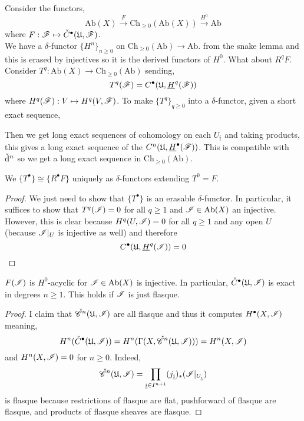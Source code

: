 \documentclass[12pt]{article}
\begin{document}
Consider the functors,
\[ \mathrm{Ab}(X) \xrightarrow{F} \mathrm{Ch}_{\ge 0}(\mathrm{Ab}(X)) \xrightarrow{H^0} \mathrm{Ab} \]
where $F : \mathscr{F} \mapsto \check{C}^\bullet(\mathfrak{U}, \mathscr{F})$. 
\bigskip\\
We have a $\delta$-functor $\{ H^n \}_{n \ge 0}$ on $\mathrm{Ch}_{\ge 0}(\mathrm{Ab}) \to \mathrm{Ab}$. from the snake lemma and this is erased by injectives so it is the derived functors of $H^0$. What about $R^q F$. Consider $T^q : \mathrm{Ab}(X) \to \mathrm{Ch}_{\ge 0}(\mathrm{Ab})$ sending,
\[ T^q(\mathscr{F}) = C^\bullet(\mathfrak{U}, \underline{H}^q(\mathscr{F})) \]
where $H^q(\mathscr{F}) : V \mapsto H^q(V, \mathscr{F})$. To make $\{ T^q \}_{q \ge 0}$ into a $\delta$-functor, given a short exact sequence,
\begin{center}
\end{center}
Then we get long exact sequences of cohomology on each $U_{\underline{i}}$ and taking products, this gives a long exact sequence of the $C^n(\mathfrak{U}, \underline{H}^\bullet(\mathscr{F}))$. This is compatible with $\check{\mathrm{d}}^n$ so we get a long exact sequence in $\mathrm{Ch}_{\ge 0}(\mathrm{Ab})$. 

\begin{lemma}
We $\{ T^\bullet \} \cong \{ R^\bullet F \}$ uniquely as $\delta$-functors extending $T^0 = F$. 
\end{lemma}

\begin{proof}
We just need to show that $\{ T^\bullet \}$ is an erasable $\delta$-functor. In particular, it suffices to show that $T^q(\mathscr{I}) = 0$ for all $q \ge 1$ and $\mathscr{I} \in \mathrm{Ab}(X)$ an injective. However, this is clear because $H^q(U, \mathscr{I}) = 0$ for all $q \ge 1$ and any open $U$ (because $\mathscr{I}|_U$ is injective as well) and therefore 
\[ C^\bullet(\mathfrak{U}, \underline{H}^q(\mathscr{I})) = 0 \]
\end{proof}

\begin{lemma}
$F(\mathscr{I})$ is $H^0$-acyclic for $\mathscr{I} \in \mathrm{Ab}(X)$ is injective. In particular, $\check{C}^\bullet(\mathfrak{U}, \mathscr{I})$ is exact in degrees $n \ge 1$. This holds if $\mathscr{I}$ is just flasque.
\end{lemma}

\begin{proof}
I claim that $\check{\mathscr{C}}^n(\mathfrak{U}, \mathscr{I})$ are all flasque and thus it computes $H^\bullet(X, \mathscr{I})$ meaning,
\[ H^n(\check{C}^\bullet(\mathfrak{U}, \mathscr{I})) = H^n(\Gamma(X, \check{\mathscr{C}}^n(\mathfrak{U}, \mathscr{I}))) = H^n(X, \mathscr{I}) \]
and $H^n(X, \mathscr{I}) = 0$ for $n \ge 0$. Indeed,
\[ \check{\mathscr{C}}^n(\mathfrak{U},\mathscr{I}) = \prod_{\underline{i} \in I^{n+1}} (j_{\underline{i}})_* (\mathscr{I}|_{U_{\underline{i}}}) \]
is flasque because restrictions of flasque are flat, pushforward of flasque are flasque, and products of flasque sheaves are flasque. 
\end{proof}
\end{document}
